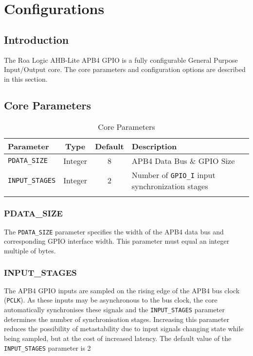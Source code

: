 \chapter{Configurations}\label{configurations}

\section{Introduction}\label{introduction-1}

The Roa Logic AHB-Lite APB4 GPIO is a fully configurable General Purpose
Input/Output core. The core parameters and configuration options are
described in this section.

\section{Core Parameters}\label{core-parameters}

\begin{longtable}[]{@{}lccl@{}}
\toprule
Parameter & Type & Default & Description\tabularnewline
\midrule
\endhead
\texttt{PDATA\_SIZE} & Integer & 8 & APB4 Data Bus \& GPIO Size\tabularnewline
\texttt{INPUT\_STAGES} & Integer & 2 & Number of \texttt{GPIO\_I} input synchronization
stages\tabularnewline
\bottomrule
\caption{Core Parameters}
\end{longtable}

\subsection{PDATA\_SIZE}\label{pdata_size}

The \texttt{PDATA\_SIZE} parameter specifies the width of the APB4 data bus and
corresponding GPIO interface width. This parameter must equal an integer
multiple of bytes.

\subsection{INPUT\_STAGES}\label{input_stages}

The APB4 GPIO inputs are sampled on the rising edge of the APB4 bus clock (\texttt{PCLK}). As these inputs may be asynchronous to the bus clock, the core automatically synchronises these signals and the \texttt{INPUT\_STAGES} parameter determines the number of synchronisation stages. Increasing this parameter reduces the possibility of metastability due to input signals changing state while being sampled, but at the cost of increased latency. The default value of the \texttt{INPUT\_STAGES} parameter is 2

